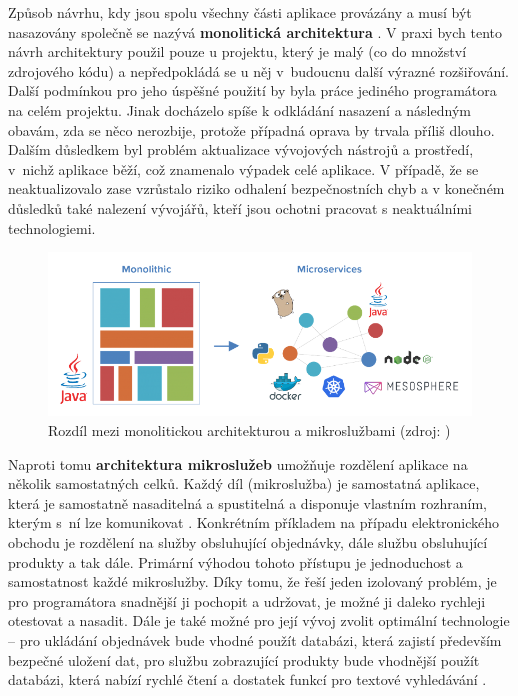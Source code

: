 \documentclass[FM,DP]{tulthesis}
\begin{document}
Způsob návrhu, kdy jsou spolu všechny části aplikace provázány a musí být nasazovány společně se
nazývá \textbf{monolitická architektura} \cite[strana~7]{microservices}. V praxi bych tento návrh architektury 
použil pouze u projektu, který je malý (co do množství zdrojového kódu) a nepředpokládá se u něj v~budoucnu 
další výrazné rozšiřování. Další podmínkou pro jeho úspěšné použití by byla práce jediného programátora na celém 
projektu. Jinak docházelo spíše k odkládání nasazení a následným obavám, zda se něco nerozbije, protože případná
oprava by trvala příliš dlouho. Dalším důsledkem byl problém aktualizace vývojových nástrojů a prostředí, 
v~nichž aplikace běží, což znamenalo výpadek celé aplikace. V případě, že se neaktualizovalo zase vzrůstalo
riziko odhalení bezpečnostních chyb a v konečném důsledků také nalezení vývojářů, kteří jsou ochotni
pracovat s neaktuálními technologiemi.

\begin{figure}[h]
\center
\includegraphics[width=\textwidth]{monolit-vs-microservices.png}
\caption{Rozdíl mezi monolitickou architekturou a mikroslužbami (zdroj: \cite{microservices-blog})}
\label{monolit-vs-microservices}
\end{figure}

Naproti tomu \textbf{architektura mikroslužeb} umožňuje rozdělení aplikace na několik samostatných celků.
Každý díl (mikroslužba) je samostatná aplikace, která je samostatně nasaditelná a spustitelná a disponuje
vlastním rozhraním, kterým s~ní lze komunikovat \cite[strana~8]{microservices}. Konkrétním příkladem na případu
elektronického obchodu je rozdělení na služby obsluhující objednávky, dále službu obsluhující produkty a tak dále. 
Primární výhodou tohoto přístupu je jednoduchost a samostatnost každé mikroslužby. Díky tomu, že řeší jeden izolovaný 
problém, je pro programátora snadnější ji pochopit a udržovat, je možné ji daleko rychleji otestovat a nasadit. 
Dále je také možné pro její vývoj zvolit optimální technologie -- pro ukládání objednávek bude vhodné
použít databázi, která zajistí především bezpečné uložení dat, pro službu zobrazující produkty bude vhodnější
použít databázi, která nabízí rychlé čtení a dostatek funkcí pro textové vyhledávání \cite[strana~83]{devops}.
\end{document}
